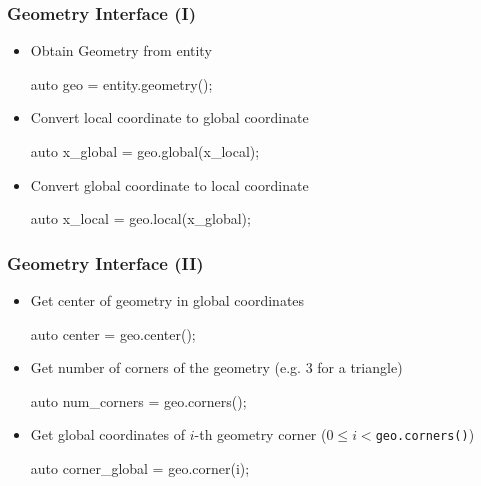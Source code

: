 \documentclass[aspectratio=169,11pt]{beamer}
\theoremstyle{definition}
\begin{document}
\begin{frame}[fragile]
  \frametitle{Geometry Interface (I)}
  \begin{itemize}
  \item Obtain Geometry from entity
    \begin{cppcode}
auto geo = entity.geometry();
    \end{cppcode}
  \item Convert local coordinate to global coordinate
    \begin{cppcode}
auto x_global = geo.global(x_local);
    \end{cppcode}
  \item Convert global coordinate to local coordinate
    \begin{cppcode}
auto x_local = geo.local(x_global);
    \end{cppcode}
  \end{itemize}
\end{frame}


\begin{frame}[fragile]
  \frametitle{Geometry Interface (II)}
  \begin{itemize}
  \item Get center of geometry in global coordinates
    \begin{cppcode}
auto center = geo.center();
    \end{cppcode}
  \item Get number of corners of the geometry (e.g. 3 for a triangle)
    \begin{cppcode}
auto num_corners = geo.corners();
    \end{cppcode}
  \item Get global coordinates of $i$-th geometry corner ($0 \leq i < $\lstinline!geo.corners()!)
    \begin{cppcode}
auto corner_global = geo.corner(i);
    \end{cppcode}
  \end{itemize}
\end{frame}
\end{document}
